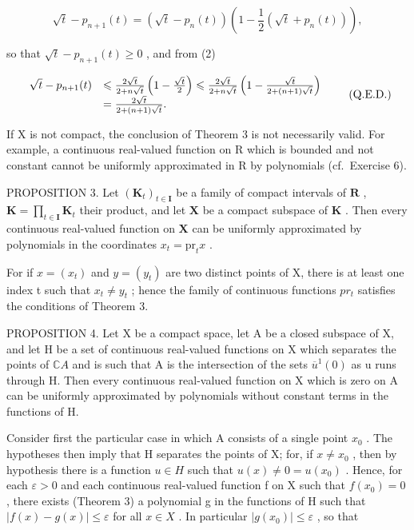 \[
\sqrt {t} - p _ {n + 1} (t) = (\sqrt {t} - p _ {n} (t)) \left(1 - \frac {1}{2} (\sqrt {t} + p _ {n} (t))\right),
\]

so that \(\sqrt{t} - p_{n+1}(t) \geqslant 0\) , and from (2)

\[
\begin{array}{r l} \sqrt {t} - p _ {n + 1} (t) & \leqslant \frac {2 \sqrt {t}}{2 + n \sqrt {t}} \left(1 - \frac {\sqrt {t}}{2}\right) \leqslant \frac {2 \sqrt {t}}{2 + n \sqrt {t}} \left(1 - \frac {\sqrt {t}}{2 + (n + 1) \sqrt {t}}\right) \\ & = \frac {2 \sqrt {t}}{2 + (n + 1) \sqrt {t}}. \end{array} \tag {Q.E.D.}
\]

If X is not compact, the conclusion of Theorem 3 is not necessarily valid. For example, a continuous real-valued function on R which is bounded and not constant cannot be uniformly approximated in R by polynomials (cf.~Exercise 6).

PROPOSITION 3. Let \((\mathbf{K}_t)_{t \in \mathbf{I}}\) be a family of compact intervals of \(\mathbf{R}\) , \(\mathbf{K} = \prod_{t \in \mathbf{I}} \mathbf{K}_t\) their product, and let \(\mathbf{X}\) be a compact subspace of \(\mathbf{K}\) . Then every continuous real-valued function on \(\mathbf{X}\) can be uniformly approximated by polynomials in the coordinates \(x_t = \mathrm{pr}_t x\) .

For if \(x = (x_{t})\) and \(y = (y_{t})\) are two distinct points of X, there is at least one index t such that \(x_{t} \neq y_{t}\) ; hence the family of continuous functions \(pr_{t}\) satisfies the conditions of Theorem 3.

PROPOSITION 4. Let X be a compact space, let A be a closed subspace of X, and let H be a set of continuous real-valued functions on X which separates the points of \(\mathbb{C}A\) and is such that A is the intersection of the sets \(\overline{u}^{1}(0)\) as u runs through H. Then every continuous real-valued function on X which is zero on A can be uniformly approximated by polynomials without constant terms in the functions of H.

Consider first the particular case in which A consists of a single point \(x_{0}\) . The hypotheses then imply that H separates the points of X; for, if \(x \neq x_{0}\) , then by hypothesis there is a function \(u \in H\) such that \(u(x) \neq 0 = u(x_{0})\) . Hence, for each \(\varepsilon > 0\) and each continuous real-valued function f on X such that \(f(x_{0}) = 0\) , there exists (Theorem 3) a polynomial g in the functions of H such that \(|f(x) - g(x)| \leqslant \varepsilon\) for all \(x \in X\) . In particular \(|g(x_{0})| \leqslant \varepsilon\) , so that

